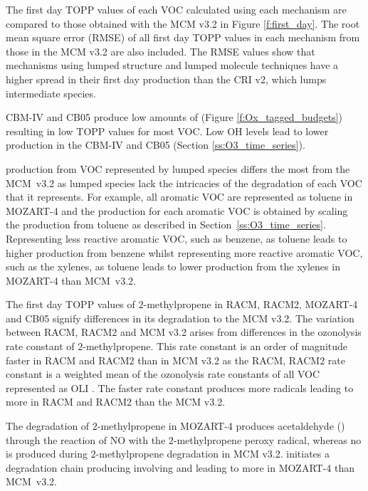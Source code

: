 The first day TOPP values of each VOC calculated using each mechanism are compared to those obtained with the MCM v3.{2} in Figure \ref{f:first_day}.
The root mean square error (RMSE) of all first day TOPP values in each mechanism from those in the MCM v3.2 are also included.
The RMSE values show that mechanisms using lumped structure and lumped molecule techniques have a higher spread in their first day  production than the CRI v2, which lumps intermediate species.

CBM-IV and CB05 produce low amounts of  (Figure \ref{f:Ox_tagged_budgets}) resulting in low TOPP values for most VOC.
Low OH levels lead to lower  production in the CBM-IV and CB05 (Section \ref{ss:O3_time_series}).

 production from VOC represented by lumped species differs the most from the \mbox{MCM v3.2} as lumped species lack the intricacies of the degradation of each VOC that it represents.
For example, all aromatic VOC are represented as toluene in MOZART-4 and the  production for each aromatic VOC is obtained by scaling the  production from toluene as described in \mbox{Section \ref{ss:O3_time_series}}.
Representing less reactive aromatic VOC, such as benzene, as toluene leads to higher  production from benzene whilst representing more reactive aromatic VOC, such as the xylenes, as toluene leads to lower  production from the xylenes in MOZART-4 than \mbox{MCM v3.2}.

The first day TOPP values of $2$-methylpropene in RACM, RACM2, MOZART-4 and CB05 signify differences in its degradation to the MCM v3.2.
The variation between RACM, RACM2 and MCM v3.2 arises from differences in the ozonolysis rate constant of $2$-methylpropene.
This rate constant is an order of magnitude faster in RACM and RACM2 than in MCM v3.2 as the RACM, RACM2 rate constant is a weighted mean of the ozonolysis rate constants of all VOC represented as OLI \citep{Stockwell:1997, Goliff:2013}.
The faster rate constant produces more radicals leading to more  in RACM and RACM2 than the MCM v3.2.

The degradation of $2$-methylpropene in MOZART-4 produces acetaldehyde () through the reaction of NO with the $2$-methylpropene peroxy radical, whereas no  is produced during $2$-methylpropene degradation in MCM v3.2.
 initiates a degradation chain producing  involving  and  leading to more  in MOZART-4 than \mbox{MCM v3.2}.

